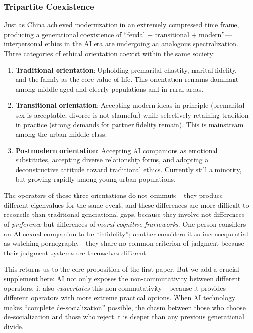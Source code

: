 ﻿\documentclass[12pt,a4paper]{article}
\begin{document}
\subsubsection{Tripartite Coexistence}

Just as China achieved modernization in an extremely compressed time frame, producing a generational coexistence of ``feudal + transitional + modern''---interpersonal ethics in the AI era are undergoing an analogous spectralization. Three categories of ethical orientation coexist within the same society:

\begin{enumerate}[label=(\arabic*)]
\item \textbf{Traditional orientation}: Upholding premarital chastity, marital fidelity, and the family as the core value of life. This orientation remains dominant among middle-aged and elderly populations and in rural areas.
\item \textbf{Transitional orientation}: Accepting modern ideas in principle (premarital sex is acceptable, divorce is not shameful) while selectively retaining tradition in practice (strong demands for partner fidelity remain). This is mainstream among the urban middle class.
\item \textbf{Postmodern orientation}: Accepting AI companions as emotional substitutes, accepting diverse relationship forms, and adopting a deconstructive attitude toward traditional ethics. Currently still a minority, but growing rapidly among young urban populations.
\end{enumerate}

The operators of these three orientations do not commute---they produce different eigenvalues for the same event, and these differences are more difficult to reconcile than traditional generational gaps, because they involve not differences of \emph{preference} but differences of \emph{moral-cognitive frameworks}. One person considers an AI sexual companion to be ``infidelity''; another considers it as inconsequential as watching pornography---they share no common criterion of judgment because their judgment systems are themselves different.

This returns us to the core proposition of the first paper. But we add a crucial supplement here: AI not only exposes the non-commutativity between different operators, it also \emph{exacerbates} this non-commutativity---because it provides different operators with more extreme practical options. When AI technology makes ``complete de-socialization'' possible, the chasm between those who choose de-socialization and those who reject it is deeper than any previous generational divide.
\end{document}
